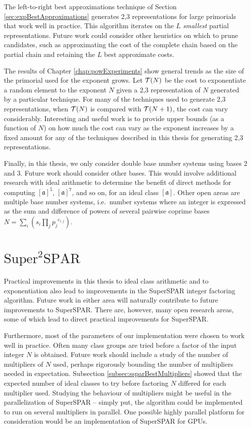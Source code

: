 \documentclass{ucalgthes1}
\theoremstyle{definition}
\newcommand{\ideal}{\mathfrak}
\newcommand{\idealclass}[1]{\left[ \ideal #1 \right]}
\newcommand{\aclass}{\idealclass a}
\begin{document}
The left-to-right best approximations technique of Section \ref{sec:expBestApproximations} generates 2,3 representations for large primorials that work well in practice.  This algorithm iterates on the $L$ \emph{smallest} partial representations.  Future work could consider other heuristics on which to prune candidates, such as approximating the cost of the complete chain based on the partial chain and retaining the $L$ best approximate costs.

The results of Chapter \ref{chap:powExperiments} show general trends as the size of the primorial used for the exponent grows.  Let $\mathcal T(N)$ be the cost to exponentiate a random element to the exponent $N$ given a 2,3 representation of $N$ generated by a particular technique.  For many of the techniques used to generate 2,3 representations, when $\mathcal T(N)$ is compared with $\mathcal T(N+1)$, the cost can vary considerably.  Interesting and useful work is to provide upper bounds (as a function of $N$) on how much the cost can vary as the exponent increases by a fixed amount for any of the techniques described in this thesis for generating 2,3 representations.

Finally, in this thesis, we only consider double base number systems using bases 2 and 3.  Future work should consider other bases.  This would involve additional research with ideal arithmetic to determine the benefit of direct methods for computing $\aclass^5$, $\aclass^7$, and so on, for an ideal class $\aclass$.  Other open areas are multiple base number systems, i.e.\ number systems where an integer is expressed as the sum and difference of powers of several pairwise coprime bases $N = \sum_i \left( s_i \prod_j {p_j}^{e_{i,j}} \right)$.


\section{$\textrm{Super}^2\textrm{SPAR}$}
\label{sec:futureSSPAR}

Practical improvements in this thesis to ideal class arithmetic and to exponentiation also lead to improvements in the SuperSPAR integer factoring algorithm.  Future work in either area will naturally contribute to future improvements to SuperSPAR.  There are, however, many open research areas, some of which lead to direct practical improvements for SuperSPAR.

Furthermore, most of the parameters of our implementation were chosen to work well in practice.  Often many class groups are tried before a factor of the input integer $N$ is obtained.  Future work should include a study of the number of multipliers of $N$ used, perhaps rigorously bounding the number of multipliers needed in expectation.  Subsection \ref{subsec:ssparBestMultipliers} showed that the expected number of ideal classes to try before factoring $N$ differed for each multiplier used.  Studying the behaviour of multipliers might be useful in the parallelization of SuperSPAR -- simply put, the algorithm could be implemented to run on several multipliers in parallel.  One possible highly parallel platform for consideration would be an implementation of SuperSPAR for GPUs.
\end{document}
